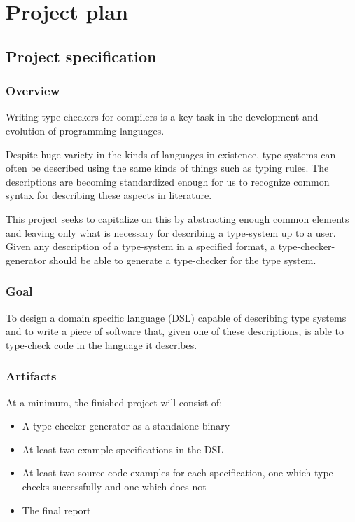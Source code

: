 \chapter{Project plan}

\section{Project specification}

  \subsection{Overview}

  Writing type-checkers for compilers is a key task in the
  development and evolution of programming languages.

  Despite huge variety in the kinds of languages in existence,
  type-systems can often be described using the same kinds of
  things such as typing rules. The descriptions are becoming
  standardized enough for us to recognize common syntax for
  describing these aspects in literature.

  This project seeks to capitalize on this by abstracting
  enough common elements and leaving only what is necessary
  for describing a type-system up to a user. Given any
  description of a type-system in a specified format, a
  type-checker-generator should be able to generate a
  type-checker for the type system.
  
  \subsection{Goal}

  To design a domain specific language (DSL) capable of describing type systems and to
  write a piece of software that, given one of these
  descriptions, is able to type-check code in the language
  it describes.

  \subsection{Artifacts}
  \label{section-artifacts}

  At a minimum, the finished project will consist of:

  \begin{itemize}
  \item A type-checker generator as a standalone binary
  \item At least two example specifications in the DSL
  \item At least two source code examples for each
    specification, one which type-checks successfully and one
    which does not
  \item The final report
  \end{itemize}
  
